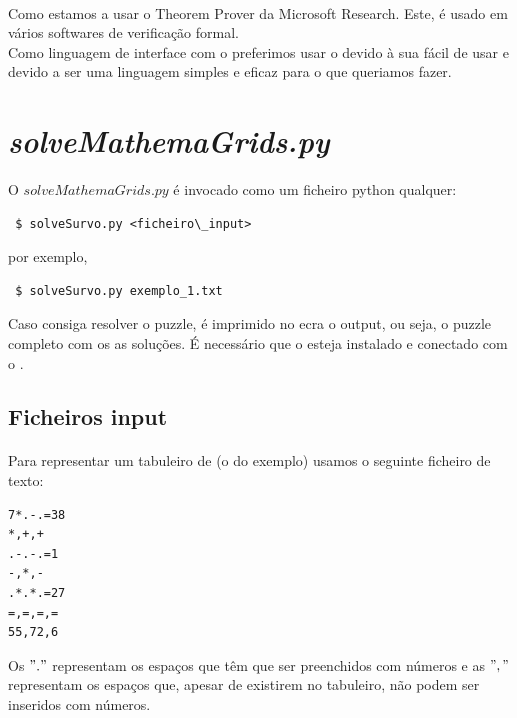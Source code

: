 \documentclass{article}
\begin{document}
\paragraph{} 
Como {} estamos a usar o {} Theorem Prover da Microsoft Research. Este, é usado em vários softwares de verificação formal. 
\\

Como linguagem de interface com o {} preferimos usar o {} {} devido à sua {} fácil de usar e devido a ser uma linguagem simples e eficaz para o que queriamos fazer.

\section{{\it{solveMathemaGrids.py}}}

\paragraph{} 
O $solveMathemaGrids.py$ é invocado como um ficheiro python qualquer:
\begin{verbatim}
 $ solveSurvo.py <ficheiro\_input>
\end{verbatim}
por exemplo,
\begin{verbatim}
 $ solveSurvo.py exemplo_1.txt
\end{verbatim}

Caso consiga resolver o puzzle, é imprimido no ecra o output, ou seja, o puzzle completo com os as soluções. É necessário que o {} esteja instalado e conectado com o {}.

\subsection{Ficheiros input}

\paragraph{} 

Para representar um tabuleiro de {} (o do exemplo) usamos o seguinte ficheiro de texto:
\begin{center}
\begin{verbatim}
7*.-.=38
*,+,+
.-.-.=1
-,*,-
.*.*.=27
=,=,=,=
55,72,6
\end{verbatim}
\end{center}

Os $"."$ representam os espaços que têm que ser preenchidos com números e as $","$ representam os espaços que, apesar de existirem no tabuleiro, não podem ser inseridos com números. 
\\
\end{document}
